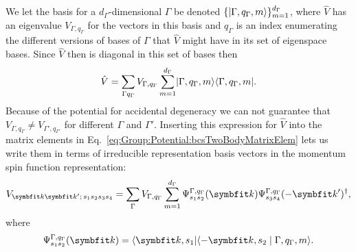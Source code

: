 We let the basis for a $d_\Gamma$-dimensional \irr $\Gamma$ be denoted $\{\lvert \Gamma,q_\Gamma,m \rangle\}_{m=1}^{d_\Gamma}$, where $\hat{V}$ has an eigenvalue $V_{\Gamma,q_\Gamma}$
for the vectors in this basis and $q_\Gamma$ is an index enumerating the different versions of bases of $\Gamma$ that $\hat{V}$ might have
in its set of eigenspace bases. Since $\hat{V}$ then is diagonal in this set of bases then
\begin{equation}
    \label{eq:Group:Potential:potIrrepDecomp}
    \hat{V} = \sum_{\Gamma q_\Gamma}V_{\Gamma,q_\Gamma}\sum_{m=1}^{d_\Gamma}\lvert \Gamma,q_\Gamma,m \rangle\langle \Gamma,q_\Gamma,m \rvert.
\end{equation}
Because of the potential for accidental degeneracy we can not guarantee that $V_{\Gamma,q_\Gamma}\neq V_{\Gamma',q_{\Gamma'}}$ for different $\Gamma$ and $\Gamma'$.
Inserting this expression for $\hat{V}$ into the matrix elements in Eq.~\eqref{eq:Group:Potential:bcsTwoBodyMatrixElem} lets us write them in terms of
irreducible representation basis vectors in the momentum spin function representation:
\begin{equation}
    \label{eq:Group:Potential:irrepPotMatrixElem}
    V_{\v{k}\v{k}';\,s_1s_2s_3s_4} = \sum_\Gamma V_{\Gamma,q_\Gamma}\sum_{m=1}^{d_\Gamma}\Psi_{s_1s_2}^{\Gamma,q_\Gamma}(\v{k})\Psi_{s_3s_4}^{\Gamma,q_\Gamma}(-\v{k}')^\dagger,
\end{equation}
where
\begin{equation}
    \label{eq:Group:Potential:irrepPotMatrixElem:coeff}
    \Psi_{s_1s_2}^{\Gamma,q_\Gamma}(\v{k}) = \bra{\v{k},s_1}\braket{-\v{k},s_2}{\Gamma,q_\Gamma,m}.
\end{equation}

